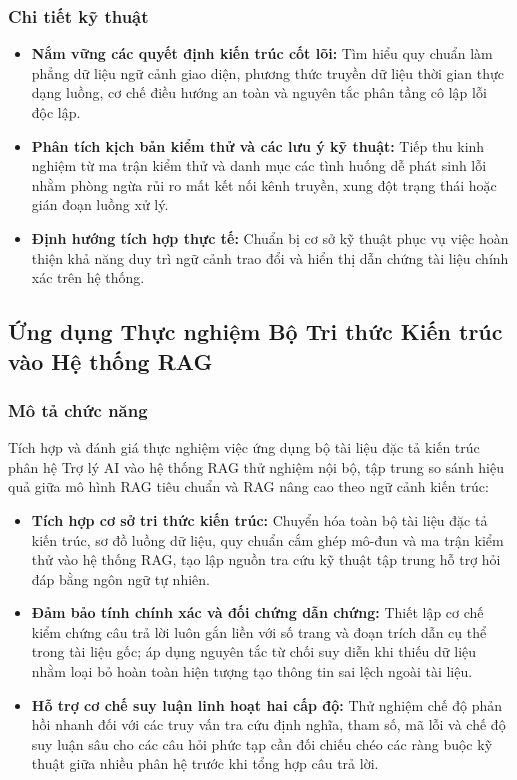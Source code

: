 \subsubsection{Chi tiết kỹ thuật}
\begin{itemize}
    \item \textbf{Nắm vững các quyết định kiến trúc cốt lõi:} Tìm hiểu quy chuẩn làm phẳng dữ liệu ngữ cảnh giao diện, phương thức truyền dữ liệu thời gian thực dạng luồng, cơ chế điều hướng an toàn và nguyên tắc phân tầng cô lập lỗi độc lập.
    \item \textbf{Phân tích kịch bản kiểm thử và các lưu ý kỹ thuật:} Tiếp thu kinh nghiệm từ ma trận kiểm thử và danh mục các tình huống dễ phát sinh lỗi nhằm phòng ngừa rủi ro mất kết nối kênh truyền, xung đột trạng thái hoặc gián đoạn luồng xử lý.
    \item \textbf{Định hướng tích hợp thực tế:} Chuẩn bị cơ sở kỹ thuật phục vụ việc hoàn thiện khả năng duy trì ngữ cảnh trao đổi và hiển thị dẫn chứng tài liệu chính xác trên hệ thống.
\end{itemize}

\subsection{Ứng dụng Thực nghiệm Bộ Tri thức Kiến trúc vào Hệ thống RAG}

\subsubsection{Mô tả chức năng}
Tích hợp và đánh giá thực nghiệm việc ứng dụng bộ tài liệu đặc tả kiến trúc phân hệ Trợ lý AI vào hệ thống RAG thử nghiệm nội bộ, tập trung so sánh hiệu quả giữa mô hình RAG tiêu chuẩn và RAG nâng cao theo ngữ cảnh kiến trúc:
\begin{itemize}
    \item \textbf{Tích hợp cơ sở tri thức kiến trúc:} Chuyển hóa toàn bộ tài liệu đặc tả kiến trúc, sơ đồ luồng dữ liệu, quy chuẩn cắm ghép mô-đun và ma trận kiểm thử vào hệ thống RAG, tạo lập nguồn tra cứu kỹ thuật tập trung hỗ trợ hỏi đáp bằng ngôn ngữ tự nhiên.
    \item \textbf{Đảm bảo tính chính xác và đối chứng dẫn chứng:} Thiết lập cơ chế kiểm chứng câu trả lời luôn gắn liền với số trang và đoạn trích dẫn cụ thể trong tài liệu gốc; áp dụng nguyên tắc từ chối suy diễn khi thiếu dữ liệu nhằm loại bỏ hoàn toàn hiện tượng tạo thông tin sai lệch ngoài tài liệu.
    \item \textbf{Hỗ trợ cơ chế suy luận linh hoạt hai cấp độ:} Thử nghiệm chế độ phản hồi nhanh đối với các truy vấn tra cứu định nghĩa, tham số, mã lỗi và chế độ suy luận sâu cho các câu hỏi phức tạp cần đối chiếu chéo các ràng buộc kỹ thuật giữa nhiều phân hệ trước khi tổng hợp câu trả lời.
\end{itemize}

